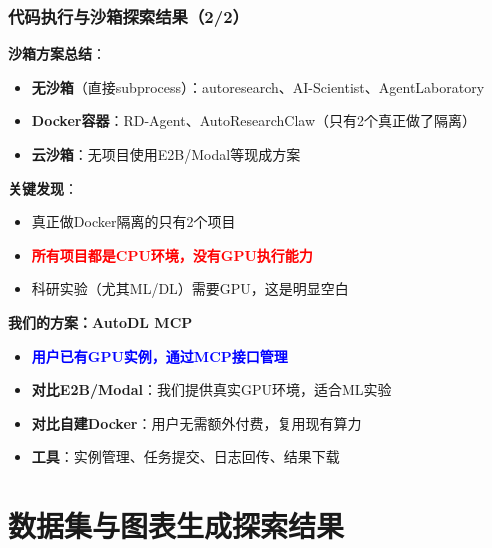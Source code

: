 \documentclass[
  aspectratio=169,
  presentation,
  titlegraphic=./images/bit_logo.pdf,
  framelogo=./images/bit_logo.pdf
]{bitbeamer}
\begin{document}
\begin{frame}[t]
  \frametitle{代码执行与沙箱探索结果（2/2）}

  \textbf{沙箱方案总结}：
  \begin{itemize}
    \item \textbf{无沙箱}（直接subprocess）：autoresearch、AI-Scientist、AgentLaboratory
    \item \textbf{Docker容器}：RD-Agent、AutoResearchClaw（只有2个真正做了隔离）
    \item \textbf{云沙箱}：无项目使用E2B/Modal等现成方案
  \end{itemize}

  \vspace{0.5cm}

  \textbf{关键发现}：
  \begin{itemize}
    \item 真正做Docker隔离的只有2个项目
    \item \textcolor{red}{\textbf{所有项目都是CPU环境，没有GPU执行能力}}
    \item 科研实验（尤其ML/DL）需要GPU，这是明显空白
  \end{itemize}

  \vspace{0.5cm}

  \textbf{我们的方案：AutoDL MCP}
  \begin{itemize}
    \item \textcolor{blue}{\textbf{用户已有GPU实例，通过MCP接口管理}}
    \item \textbf{对比E2B/Modal}：我们提供真实GPU环境，适合ML实验
    \item \textbf{对比自建Docker}：用户无需额外付费，复用现有算力
    \item \textbf{工具}：实例管理、任务提交、日志回传、结果下载
  \end{itemize}

\end{frame}

\section{数据集与图表生成探索结果}
\end{document}
